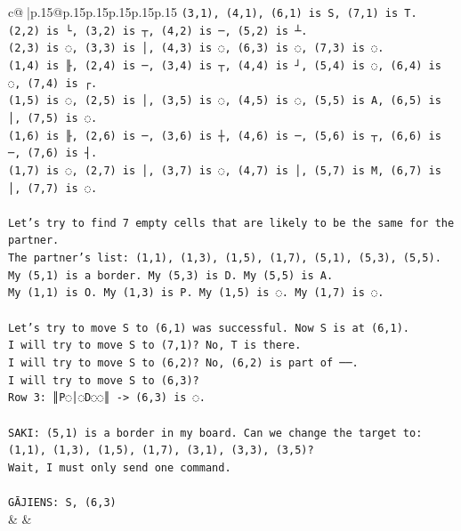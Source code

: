 \documentclass{article}
\begin{document}
{\begin{supertabular}{c@{$\;$}|p{.15\linewidth}@{}p{.15\linewidth}p{.15\linewidth}p{.15\linewidth}p{.15\linewidth}p{.15\linewidth}}
{{{\texttt{(3,1), (4,1), (6,1) is S, (7,1) is T.} \\
\texttt{(2,2) is └, (3,2) is ┬, (4,2) is ─, (5,2) is ┴.} \\
\texttt{(2,3) is ◌, (3,3) is │, (4,3) is ◌, (6,3) is ◌, (7,3) is ◌.} \\
\texttt{(1,4) is ╟, (2,4) is ─, (3,4) is ┬, (4,4) is ┘, (5,4) is ◌, (6,4) is ◌, (7,4) is ┌.} \\
\texttt{(1,5) is ◌, (2,5) is │, (3,5) is ◌, (4,5) is ◌, (5,5) is A, (6,5) is │, (7,5) is ◌.} \\
\texttt{(1,6) is ╟, (2,6) is ─, (3,6) is ┼, (4,6) is ─, (5,6) is ┬, (6,6) is ─, (7,6) is ┤.} \\
\texttt{(1,7) is ◌, (2,7) is │, (3,7) is ◌, (4,7) is │, (5,7) is M, (6,7) is │, (7,7) is ◌.} \\
\\ 
\texttt{Let's try to find 7 empty cells that are likely to be the same for the partner.} \\
\texttt{The partner's list: (1,1), (1,3), (1,5), (1,7), (5,1), (5,3), (5,5).} \\
\texttt{My (5,1) is a border. My (5,3) is D. My (5,5) is A.} \\
\texttt{My (1,1) is O. My (1,3) is P. My (1,5) is ◌. My (1,7) is ◌.} \\
\\ 
\texttt{Let's try to move S to (6,1) was successful. Now S is at (6,1).} \\
\texttt{I will try to move S to (7,1)? No, T is there.} \\
\texttt{I will try to move S to (6,2)? No, (6,2) is part of ──.} \\
\texttt{I will try to move S to (6,3)?} \\
\texttt{Row 3: ║P◌│◌D◌◌║ {-}> (6,3) is ◌.} \\
\\ 
\texttt{SAKI: (5,1) is a border in my board. Can we change the target to: (1,1), (1,3), (1,5), (1,7), (3,1), (3,3), (3,5)?} \\
\texttt{Wait, I must only send one command.} \\
\\ 
\texttt{GĀJIENS: S, (6,3)} \\
            }
        }
    }
    & & \\ \\


\end{supertabular}}
\end{document}
